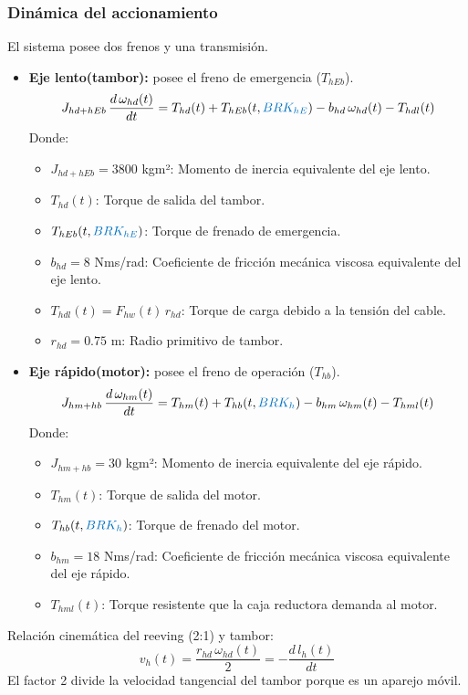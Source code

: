 \documentclass{article}
\begin{document}
\subsubsection{Dinámica del accionamiento}
El sistema posee dos frenos y una transmisión.
\begin{itemize}
\item \textbf{Eje lento(tambor):} posee el freno de emergencia ($T_{hEb}$).
\begin{equation}
    J_{hd+hEb} \, \frac{d \, \omega_{hd}(t)}{dt} = T_{hd}(t) + T_{hEb}(t,\textcolor{signalcolor}{BRK_{hE}}) - b_{hd} \, \omega_{hd}(t) - T_{hdl}(t)
\end{equation}
Donde:
\begin{itemize}
    \item $J_{hd+hEb} = 3800$ kgm²: Momento de inercia equivalente del eje lento.
    \item $T_{hd}(t)$: Torque de salida del tambor.
    \item $T_{hEb}(t,\textcolor{signalcolor}{BRK_{hE}})$: Torque de frenado de emergencia.
    \item $b_{hd} = 8$ Nms/rad: Coeficiente de fricción mecánica viscosa equivalente del eje lento.
    \item $T_{hdl}(t)=F_{hw}(t)\,r_{hd}$: Torque de carga debido a la tensión del cable.
    \item $r_{hd} = 0.75$ m: Radio primitivo de tambor.
\end{itemize}
\item \textbf{Eje rápido(motor):} posee el freno de operación ($T_{hb}$).
\begin{equation}
    J_{hm+hb} \, \frac{d \, \omega_{hm}(t)}{dt} = T_{hm}(t) + T_{hb}(t,\textcolor{signalcolor}{BRK_{h}}) - b_{hm} \, \omega_{hm}(t) - T_{hml}(t)
\end{equation}
Donde:
\begin{itemize}
    \item $J_{hm+hb} = 30$ kgm²: Momento de inercia equivalente del eje rápido.
    \item $T_{hm}(t)$: Torque de salida del motor.
    \item $T_{hb}(t,\textcolor{signalcolor}{BRK_{h}})$: Torque de frenado del motor.
    \item $b_{hm} = 18$ Nms/rad: Coeficiente de fricción mecánica viscosa equivalente del eje rápido.
    \item $T_{hml}(t)$: Torque resistente que la caja reductora demanda al motor.
\end{itemize}
\end{itemize}
Relación cinemática del reeving (2:1) y tambor:
\begin{equation}
    v_h(t) = \frac{r_{hd} \, \omega_{hd}(t)}{2} = -\frac{d \, l_h(t)}{dt}
\end{equation}
El factor 2 divide la velocidad tangencial del tambor porque es un aparejo móvil.
\end{document}
